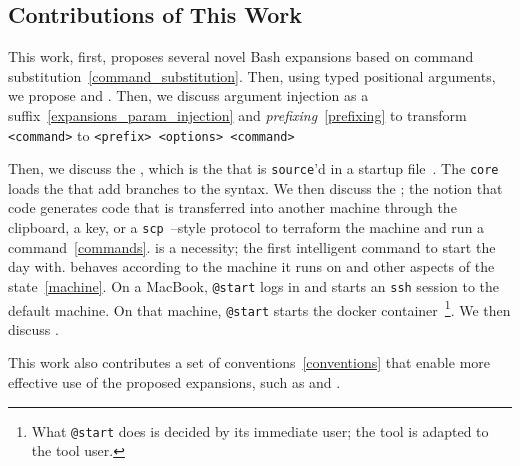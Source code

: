 \subsection{Contributions of This Work}\label{contributions}

This work, first, proposes several novel Bash expansions based on command substitution~\ref{command_substitution}. Then, using typed positional arguments, we propose  and . Then, we discuss argument injection as a suffix~\ref{expansions_param_injection} and \emph{prefixing}~\ref{prefixing} to transform \texttt{<command>} to \texttt{<prefix> <options> <command>}

Then, we discuss the , which is the \kCallable that is \texttt{source}'d in a startup file~\cite{bash_startup_files}. The \texttt{core} loads the  that add branches to the syntax. We then discuss the \kSeed; the notion that code generates code that is transferred into another machine through the clipboard, a key, or a \texttt{scp}~\cite{scp}--style protocol to terraform the machine and run a command~\ref{commands}. \kStart is a necessity; the first intelligent command to start the day with. \kStart behaves according to the machine it runs on and other aspects of the state~\ref{machine}. On a MacBook, \texttt{@start} logs in and starts an \texttt{ssh} session to the default machine. On that machine, \texttt{@start} starts the docker container~\footnote{What \texttt{@start} does is decided by its immediate user; the tool is adapted to the tool user.}. We then discuss \kGit.

This work also contributes a set of conventions~\ref{conventions} that enable more effective use of the proposed expansions, such as  and .